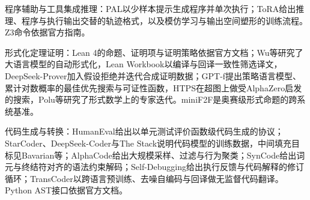 \begin{fullwidth}
程序辅助与工具集成推理：PAL以少样本提示生成程序并单次执行；ToRA给出推理、程序与执行输出交替的轨迹格式，以及模仿学习与输出空间塑形的训练流程。Z3命令依据官方指南。
\par{}
\par{}
\par{}
\end{fullwidth}

\begin{fullwidth}
\raggedright
形式化定理证明：Lean 4的命题、证明项与证明策略依据官方文档；Wu等研究了大语言模型的自动形式化，Lean Workbook以编译与回译一致性筛选译文，DeepSeek-Prover加入假设拒绝并迭代合成证明数据；GPT-f提出策略语言模型、累计对数概率的最佳优先搜索与可证性函数，HTPS在超图上做受AlphaZero启发的搜索，Polu等研究了形式数学上的专家迭代。miniF2F是奥赛级形式命题的跨系统基准。
\par{}
\par{}
\par{}
\par{}
\par{}
\par{}
\par{}
\par{}
\end{fullwidth}

\begin{fullwidth}
\raggedright
代码生成与转换：HumanEval给出以单元测试评价函数级代码生成的协议；StarCoder、DeepSeek-Coder与The Stack说明代码模型的训练数据，中间填充目标见Bavarian等；AlphaCode给出大规模采样、过滤与行为聚类；SynCode给出词元与终结符对齐的语法约束解码；Self-Debugging给出执行反馈与代码解释的修订循环；TransCoder以跨语言预训练、去噪自编码与回译做无监督代码翻译。Python AST接口依据官方文档。
\par{}
\par{}
\par{}
\par{}
\par{}
\par{}
\par{}
\par{}
\par{}
\par{}
\end{fullwidth}

